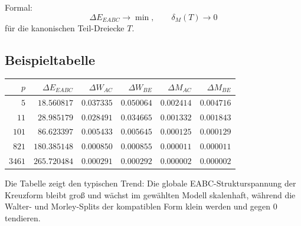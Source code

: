 Formal:
\[
\Delta E_{EABC}\to \min,
\qquad
\delta_M(T)\to 0
\]
für die kanonischen Teil-Dreiecke $T$.

\subsection{Beispieltabelle}

\begin{center}
\begin{tabular}{r|r r r r r}
$p$ & $\Delta E_{EABC}$ & $\Delta W_{AC}$ & $\Delta W_{BE}$ & $\Delta M_{AC}$ & $\Delta M_{BE}$\\
\hline
$5$    & $18.560817$  & $0.037335$ & $0.050064$ & $0.002414$ & $0.004716$\\
$11$   & $28.985179$  & $0.028491$ & $0.034665$ & $0.001332$ & $0.001843$\\
$101$  & $86.623397$  & $0.005433$ & $0.005645$ & $0.000125$ & $0.000129$\\
$821$  & $180.385148$ & $0.000850$ & $0.000855$ & $0.000011$ & $0.000011$\\
$3461$ & $265.720484$ & $0.000291$ & $0.000292$ & $0.000002$ & $0.000002$\\
\end{tabular}
\end{center}

Die Tabelle zeigt den typischen Trend: Die globale EABC-Strukturspannung der Kreuzform bleibt groß und wächst im gewählten Modell skalenhaft, während die Walter- und Morley-Splits der kompatiblen Form klein werden und gegen $0$ tendieren.
